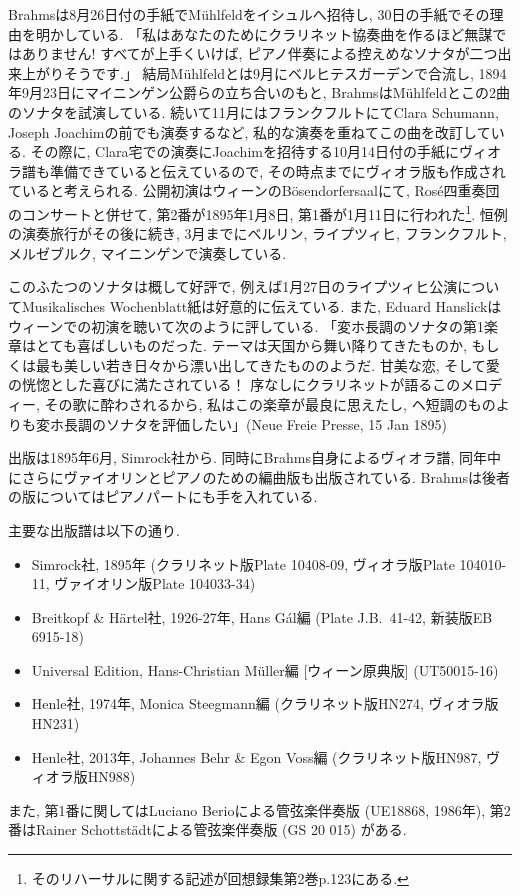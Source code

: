 Brahmsは8月26日付の手紙でMühlfeldをイシュルへ招待し, 30日の手紙でその理由を明かしている\cite{henle}.
「私はあなたのためにクラリネット協奏曲を作るほど無謀ではありません! すべてが上手くいけば, ピアノ伴奏による控えめなソナタが二つ出来上がりそうです.」
結局Mühlfeldとは9月にベルヒテスガーデンで合流し, 1894年9月23日にマイニンゲン公爵らの立ち合いのもと, BrahmsはMühlfeldとこの2曲のソナタを試演している\cite{compos}.
続いて11月にはフランクフルトにてClara Schumann, Joseph Joachimの前でも演奏するなど, 私的な演奏を重ねてこの曲を改訂している\cite{henle}.
その際に, Clara宅での演奏にJoachimを招待する10月14日付の手紙にヴィオラ譜も準備できていると伝えているので,
その時点までにヴィオラ版も作成されていると考えられる\cite{henle}.
公開初演はウィーンのBösendorfersaalにて, Rosé四重奏団のコンサートと併せて, 第2番が1895年1月8日,
第1番が1月11日に行われた\footnote{そのリハーサルに関する記述が回想録集第2巻p.123にある.}\cite{library}\cite{henle}.
恒例の演奏旅行がその後に続き, 3月までにベルリン, ライプツィヒ, フランクフルト, メルゼブルク, マイニンゲンで演奏している\cite{compos}.

このふたつのソナタは概して好評で, 例えば1月27日のライプツィヒ公演についてMusikalisches Wochenblatt紙は好意的に伝えている.
また, Eduard Hanslickはウィーンでの初演を聴いて次のように評している\cite{henle}.
「変ホ長調のソナタの第1楽章はとても喜ばしいものだった. テーマは天国から舞い降りてきたものか, もしくは最も美しい若き日々から漂い出してきたもののようだ.
甘美な恋, そして愛の恍惚とした喜びに満たされている！ 序なしにクラリネットが語るこのメロディー, その歌に酔わされるから,
私はこの楽章が最良に思えたし, ヘ短調のものよりも変ホ長調のソナタを評価したい」(Neue Freie Presse, 15 Jan 1895)

出版は1895年6月, Simrock社から. 同時にBrahms自身によるヴィオラ譜, 同年中にさらにヴァイオリンとピアノのための編曲版も出版されている\cite{imslp}.
Brahmsは後者の版についてはピアノパートにも手を入れている.

主要な出版譜は以下の通り.
\begin{itemize}
	\item Simrock社, 1895年 (クラリネット版Plate 10408-09, ヴィオラ版Plate 104010-11, ヴァイオリン版Plate 104033-34)
	\item Breitkopf \& Härtel社, 1926-27年, Hans Gál編 (Plate J.B.~41-42, 新装版EB 6915-18)
	\item Universal Edition, Hans-Christian Müller編 [ウィーン原典版] (UT50015-16)
	\item Henle社, 1974年, Monica Steegmann編 (クラリネット版HN274, ヴィオラ版HN231)
	\item Henle社, 2013年, Johannes Behr \& Egon Voss編 (クラリネット版HN987, ヴィオラ版HN988)
\end{itemize}
また, 第1番に関してはLuciano Berioによる管弦楽伴奏版 (UE18868, 1986年), 第2番はRainer Schottstädtによる管弦楽伴奏版 (GS 20 015) がある.
